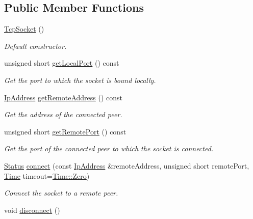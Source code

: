 \subsection*{Public Member Functions}
\begin{DoxyCompactItemize}
\item 
\mbox{\hyperlink{classsf_1_1_tcp_socket_a62a9bf81fd7f15fedb29fd1348483236}{Tcp\+Socket}} ()
\begin{DoxyCompactList}\small\item\em Default constructor. \end{DoxyCompactList}\item 
unsigned short \mbox{\hyperlink{classsf_1_1_tcp_socket_a98e45f0f49af1fd99216b9195e86d86b}{get\+Local\+Port}} () const
\begin{DoxyCompactList}\small\item\em Get the port to which the socket is bound locally. \end{DoxyCompactList}\item 
\mbox{\hyperlink{classsf_1_1_ip_address}{Ip\+Address}} \mbox{\hyperlink{classsf_1_1_tcp_socket_aa8579c203b1fd21beb74d7f76444a94c}{get\+Remote\+Address}} () const
\begin{DoxyCompactList}\small\item\em Get the address of the connected peer. \end{DoxyCompactList}\item 
unsigned short \mbox{\hyperlink{classsf_1_1_tcp_socket_a93bced0afd4b1c60797a85725be04951}{get\+Remote\+Port}} () const
\begin{DoxyCompactList}\small\item\em Get the port of the connected peer to which the socket is connected. \end{DoxyCompactList}\item 
\mbox{\hyperlink{classsf_1_1_socket_a51bf0fd51057b98a10fbb866246176dc}{Status}} \mbox{\hyperlink{classsf_1_1_tcp_socket_a68cd42d5ab70ab54b16787f555951c40}{connect}} (const \mbox{\hyperlink{classsf_1_1_ip_address}{Ip\+Address}} \&remote\+Address, unsigned short remote\+Port, \mbox{\hyperlink{classsf_1_1_time}{Time}} timeout=\mbox{\hyperlink{classsf_1_1_time_a8db127b632fa8da21550e7282af11fa0}{Time\+::\+Zero}})
\begin{DoxyCompactList}\small\item\em Connect the socket to a remote peer. \end{DoxyCompactList}\item 
void \mbox{\hyperlink{classsf_1_1_tcp_socket_ac18f518a9be3d6be5e74b9404c253c1e}{disconnect}} ()

\end{DoxyCompactItemize}
